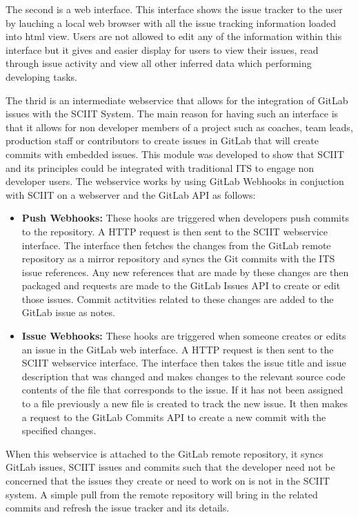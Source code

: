 \documentclass{mproj}
\begin{document}
The second is a web interface. This interface shows the issue tracker to the user by lauching a local web browser with all the issue tracking information loaded into html view. Users are not allowed to edit any of the information within this interface but it gives and easier display for users to view their issues, read through issue activity and view all other inferred data which performing developing tasks.

The thrid is an intermediate webservice that allows for the integration of GitLab issues with the SCIIT System. The main reason for having such an interface is that it allows for non developer members of a project such as coaches, team leads, production staff or contributors to create issues in GitLab that will create commits with embedded issues. This module was developed to show that SCIIT and its principles could be integrated with traditional ITS to engage non developer users. The webservice works by using GitLab Webhooks in conjuction with SCIIT on a webserver and the GitLab API as follows:

\begin{itemize}
  \item \textbf{Push Webhooks:} These hooks are triggered when developers push commits to the repository. A HTTP request is then sent to the SCIIT webservice interface. The interface then fetches the changes from the GitLab remote repository as a mirror repository and syncs the Git commits with the ITS issue references. Any new references that are made by these changes are then packaged and requests are made to the GitLab Issues API to create or edit those issues. Commit actitvities related to these changes are added to the GitLab issue as notes.
  \item \textbf{Issue Webhooks:} These hooks are triggered when someone creates or edits an issue in the GitLab web interface. A HTTP request is then sent to the SCIIT webservice interface. The interface then takes the issue title and issue description that was changed and makes changes to the relevant source code contents of the file that corresponds to the issue. If it has not been assigned to a file previously a new file is created to track the new issue. It then makes a request to the GitLab Commits API to create a new commit with the specified changes.
\end{itemize}

When this webservice is attached to the GitLab remote repository, it syncs GitLab issues, SCIIT issues and commits such that the developer need not be concerned that the issues they create or need to work on is not in the SCIIT system. A simple pull from the remote repository will bring in the related commits and refresh the issue tracker and its details.
\end{document}
